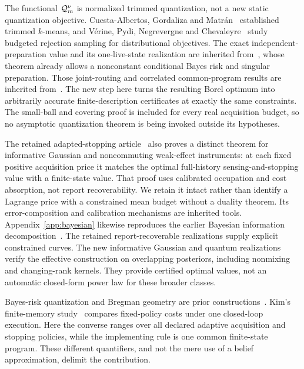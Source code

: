 The functional $\mathcal Q_m^\nu$ is normalized trimmed quantization, not a new static quantization objective. Cuesta-Albertos, Gordaliza and Matr\'an~\cite{CGM} established trimmed $k$-means, and V\'erine, Pydi, Negrevergne and Chevaleyre~\cite{VPNC} study budgeted rejection sampling for distributional objectives. The exact independent-preparation value and its one-live-state realization are inherited from~\cite{GTFStopped}, whose theorem already allows a nonconstant conditional Bayes risk and singular preparation. Those joint-routing and correlated common-program results are inherited from~\cite{GTFMean}. The new step here turns the resulting Borel optimum into arbitrarily accurate finite-description certificates at exactly the same constraints. The small-ball and covering proof is included for every real acquisition budget, so no asymptotic quantization theorem is being invoked outside its hypotheses.

The retained adapted-stopping article~\cite{GTFStopped} also proves a distinct theorem for informative Gaussian and noncommuting weak-effect instruments: at each fixed positive acquisition price it matches the optimal full-history sensing-and-stopping value with a finite-state value. That proof uses calibrated occupation and cost absorption, not report recoverability. We retain it intact rather than identify a Lagrange price with a constrained mean budget without a duality theorem. Its error-composition and calibration mechanisms are inherited tools. Appendix~\ref{app:bayesian} likewise reproduces the earlier Bayesian information decomposition~\cite{GTFBayes}. The retained report-recoverable realizations supply explicit constrained curves. The new informative Gaussian and quantum realizations verify the effective construction on overlapping posteriors, including nonmixing and changing-rank kernels. They provide certified optimal values, not an automatic closed-form power law for these broader classes.

Bayes-risk quantization and Bregman geometry are prior constructions~\cite{Varshney}. Kim's finite-memory study~\cite{Kim} compares fixed-policy costs under one closed-loop execution. Here the converse ranges over all declared adaptive acquisition and stopping policies, while the implementing rule is one common finite-state program. These different quantifiers, and not the mere use of a belief approximation, delimit the contribution.

